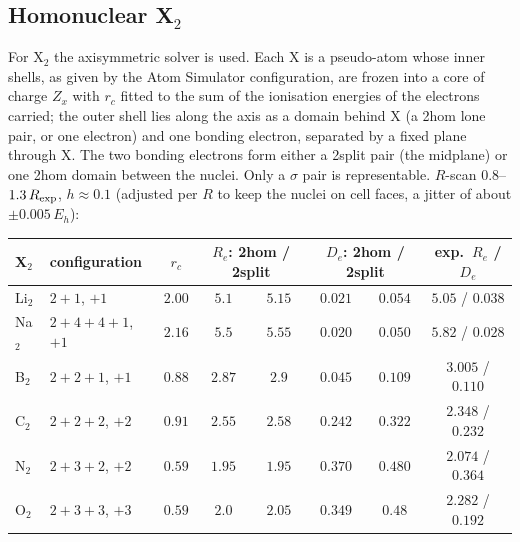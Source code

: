 \documentclass[11pt]{article}
\begin{document}
\subsection{Homonuclear X$_2$}
\label{sec:x2}

For X$_2$ the axisymmetric solver is used. Each X is a pseudo-atom whose inner shells, as given by
the Atom Simulator configuration, are frozen into a core of charge $Z_x$ with $r_c$ fitted to the sum
of the ionisation energies of the electrons carried; the outer shell lies along the axis as a
domain behind X (a 2hom lone pair, or one electron) and one bonding electron, separated by a fixed
plane through X. The two bonding electrons form either a 2split pair (the midplane) or one 2hom
domain between the nuclei. Only a $\sigma$ pair is representable. $R$-scan $0.8$--$1.3\,R_{\rm exp}$,
$h \approx 0.1$ (adjusted per $R$ to keep the nuclei on cell faces, a jitter of about
$\pm0.005\,E_h$):
\begin{center}
\small
\setlength{\tabcolsep}{4pt}
\begin{tabular}{llcccccc}
\toprule
X$_2$ & configuration & $r_c$ & \multicolumn{2}{c}{$R_e$: 2hom / 2split} & \multicolumn{2}{c}{$D_e$: 2hom / 2split} & exp.\ $R_e$ / $D_e$ \\
\midrule
Li$_2$ & $2{+}1$, $+1$        & $2.00$ & $5.1$  & $5.15$ & $0.021$ & $0.054$ & $5.05$ / $0.038$ \\
Na$_2$ & $2{+}4{+}4{+}1$, $+1$ & $2.16$ & $5.5$  & $5.55$ & $0.020$ & $0.050$ & $5.82$ / $0.028$ \\
B$_2$  & $2{+}2{+}1$, $+1$    & $0.88$ & $2.87$ & $2.9$  & $0.045$ & $0.109$ & $3.005$ / $0.110$ \\
C$_2$  & $2{+}2{+}2$, $+2$    & $0.91$ & $2.55$ & $2.58$ & $0.242$ & $0.322$ & $2.348$ / $0.232$ \\
N$_2$  & $2{+}3{+}2$, $+2$    & $0.59$ & $1.95$ & $1.95$ & $0.370$ & $0.480$ & $2.074$ / $0.364$ \\
O$_2$  & $2{+}3{+}3$, $+3$    & $0.59$ & $2.0$  & $2.05$ & $0.349$ & $0.48$  & $2.282$ / $0.192$ \\
\bottomrule
\end{tabular}
\end{center}
\end{document}
